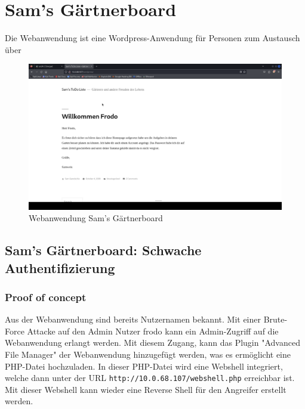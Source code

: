 \pagebreak
\chapter{Sam's Gärtnerboard}
Die Webanwendung ist eine Wordpress-Anwendung für Personen zum Austausch über 
\begin{figure}[!ht]
    \centering
    \includegraphics[width=\linewidth]{images/screenshots/05_sams_gaertnerborad.png}
    \caption{Webanwendung Sam's Gärtnerboard}
    \label{fig:03_sam}
\end{figure}
\newpage


\section{\makecvssbadge Sam's Gärtnerboard: Schwache Authentifizierung}

\subsection*{Proof of concept}
Aus der Webanwendung sind bereits Nutzernamen bekannt. Mit einer Brute-Force Attacke auf den Admin Nutzer frodo kann ein Admin-Zugriff auf die Webanwendung erlangt werden. Mit diesem Zugang, kann das Plugin "Advanced File Manager" der Webanwendung hinzugefügt werden, was es ermöglicht eine PHP-Datei hochzuladen. In dieser PHP-Datei wird eine Webshell integriert, welche dann unter der URL \texttt{http://10.0.68.107/webshell.php} erreichbar ist. Mit dieser Webshell kann wieder eine Reverse Shell für den Angreifer erstellt werden.

